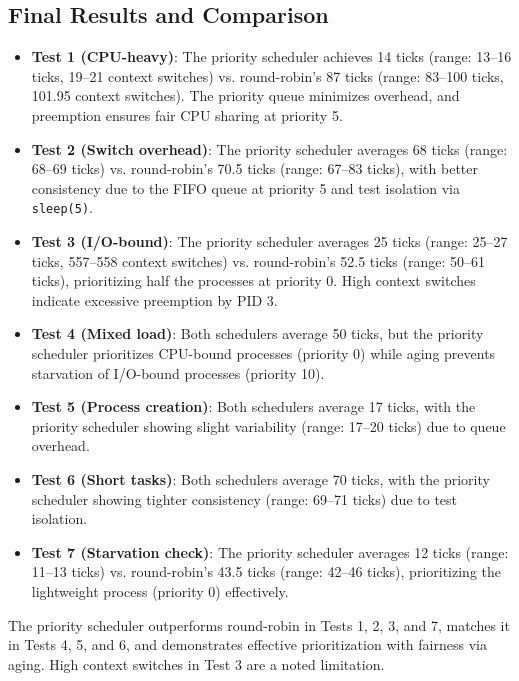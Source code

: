 \documentclass[12pt]{article}
\begin{document}
\subsection{Final Results and Comparison}
\label{subsec:priority-results}

\begin{itemize}
  \item \textbf{Test 1 (CPU-heavy)}: The priority scheduler achieves 14 ticks (range: 13–16 ticks, 19–21 context switches) vs. round-robin’s 87 ticks (range: 83–100 ticks, 101.95 context switches). The priority queue minimizes overhead, and preemption ensures fair CPU sharing at priority 5.
  \item \textbf{Test 2 (Switch overhead)}: The priority scheduler averages 68 ticks (range: 68–69 ticks) vs. round-robin’s 70.5 ticks (range: 67–83 ticks), with better consistency due to the FIFO queue at priority 5 and test isolation via \texttt{sleep(5)}.
  \item \textbf{Test 3 (I/O-bound)}: The priority scheduler averages 25 ticks (range: 25–27 ticks, 557–558 context switches) vs. round-robin’s 52.5 ticks (range: 50–61 ticks), prioritizing half the processes at priority 0. High context switches indicate excessive preemption by PID 3.
  \item \textbf{Test 4 (Mixed load)}: Both schedulers average 50 ticks, but the priority scheduler prioritizes CPU-bound processes (priority 0) while aging prevents starvation of I/O-bound processes (priority 10).
  \item \textbf{Test 5 (Process creation)}: Both schedulers average 17 ticks, with the priority scheduler showing slight variability (range: 17–20 ticks) due to queue overhead.
  \item \textbf{Test 6 (Short tasks)}: Both schedulers average 70 ticks, with the priority scheduler showing tighter consistency (range: 69–71 ticks) due to test isolation.
  \item \textbf{Test 7 (Starvation check)}: The priority scheduler averages 12 ticks (range: 11–13 ticks) vs. round-robin’s 43.5 ticks (range: 42–46 ticks), prioritizing the lightweight process (priority 0) effectively.
\end{itemize}

The priority scheduler outperforms round-robin in Tests 1, 2, 3, and 7, matches it in Tests 4, 5, and 6, and demonstrates effective prioritization with fairness via aging. High context switches in Test 3 are a noted limitation.

\end{document}

